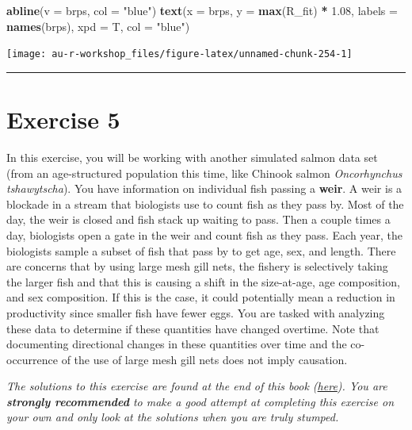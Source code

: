 \documentclass[]{book}
\newenvironment{Shaded}{\begin{snugshade}}{\end{snugshade}}
\newcommand{\KeywordTok}[1]{\textcolor[rgb]{0.13,0.29,0.53}{\textbf{#1}}}
\newcommand{\DataTypeTok}[1]{\textcolor[rgb]{0.13,0.29,0.53}{#1}}
\newcommand{\FloatTok}[1]{\textcolor[rgb]{0.00,0.00,0.81}{#1}}
\newcommand{\StringTok}[1]{\textcolor[rgb]{0.31,0.60,0.02}{#1}}
\newcommand{\OperatorTok}[1]{\textcolor[rgb]{0.81,0.36,0.00}{\textbf{#1}}}
\newcommand{\NormalTok}[1]{#1}
\theoremstyle{definition}
\theoremstyle{definition}
\theoremstyle{definition}
\theoremstyle{remark}
\begin{document}
\begin{Shaded}
\begin{Highlighting}[]
\KeywordTok{abline}\NormalTok{(}\DataTypeTok{v =}\NormalTok{ brps, }\DataTypeTok{col =} \StringTok{"blue"}\NormalTok{)}
\KeywordTok{text}\NormalTok{(}\DataTypeTok{x =}\NormalTok{ brps, }\DataTypeTok{y =} \KeywordTok{max}\NormalTok{(R_fit) }\OperatorTok{*}\StringTok{ }\FloatTok{1.08}\NormalTok{, }
     \DataTypeTok{labels =} \KeywordTok{names}\NormalTok{(brps), }\DataTypeTok{xpd =}\NormalTok{ T, }\DataTypeTok{col =} \StringTok{"blue"}\NormalTok{)}
\end{Highlighting}
\end{Shaded}

\begin{center}\texttt{[image: au-r-workshop\_files/figure-latex/unnamed-chunk-254-1]} \end{center}

\begin{center}\rule{0.5\linewidth}{\linethickness}\end{center}

\section*{Exercise 5}\label{exercise-5}

In this exercise, you will be working with another simulated salmon data
set (from an age-structured population this time, like Chinook salmon
\emph{Oncorhynchus tshawytscha}). You have information on individual
fish passing a \textbf{weir}. A weir is a blockade in a stream that
biologists use to count fish as they pass by. Most of the day, the weir
is closed and fish stack up waiting to pass. Then a couple times a day,
biologists open a gate in the weir and count fish as they pass. Each
year, the biologists sample a subset of fish that pass by to get age,
sex, and length. There are concerns that by using large mesh gill nets,
the fishery is selectively taking the larger fish and that this is
causing a shift in the size-at-age, age composition, and sex
composition. If this is the case, it could potentially mean a reduction
in productivity since smaller fish have fewer eggs. You are tasked with
analyzing these data to determine if these quantities have changed
overtime. Note that documenting directional changes in these quantities
over time and the co-occurrence of the use of large mesh gill nets does
not imply causation.

\emph{The solutions to this exercise are found at the end of this book
(\protect\hyperlink{ex5-answers}{here}). You are \textbf{strongly
recommended} to make a good attempt at completing this exercise on your
own and only look at the solutions when you are truly stumped.}
\end{document}
